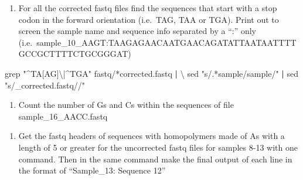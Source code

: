 \documentclass[
  letterpaper,
  DIV=11,
  numbers=noendperiod]{scrreprt}
\newenvironment{Shaded}{\begin{snugshade}}{\end{snugshade}}
\newcommand{\AttributeTok}[1]{\textcolor[rgb]{0.40,0.45,0.13}{#1}}
\newcommand{\DataTypeTok}[1]{\textcolor[rgb]{0.68,0.00,0.00}{#1}}
\newcommand{\FunctionTok}[1]{\textcolor[rgb]{0.28,0.35,0.67}{#1}}
\newcommand{\KeywordTok}[1]{\textcolor[rgb]{0.00,0.23,0.31}{\textbf{#1}}}
\newcommand{\NormalTok}[1]{\textcolor[rgb]{0.00,0.23,0.31}{#1}}
\newcommand{\PreprocessorTok}[1]{\textcolor[rgb]{0.68,0.00,0.00}{#1}}
\newcommand{\StringTok}[1]{\textcolor[rgb]{0.13,0.47,0.30}{#1}}
\providecommand{\tightlist}{%
  \setlength{\itemsep}{0pt}\setlength{\parskip}{0pt}}
\begin{document}
\begin{enumerate}
\def\labelenumi{\arabic{enumi}.}
\setcounter{enumi}{7}
\tightlist
\item
  For all the corrected fastq files find the sequences that start with a
  stop codon in the forward orientation (i.e.~TAG, TAA or TGA). Print
  out to screen the sample name and sequence info separated by a ``:''
  only
  (i.e.~sample\_10\_AAGT:TAAGAGAACAATGAACAGATATTAATAATTTTGCCGCTTTTCTGCGGGAT)
\end{enumerate}

\begin{Shaded}
\begin{Highlighting}[]
\FunctionTok{grep} \StringTok{"\^{}TA[AG]\textbackslash{}|\^{}TGA"}\NormalTok{ fastq/}\PreprocessorTok{*}\NormalTok{corrected.fastq }\KeywordTok{|} \DataTypeTok{\textbackslash{}}
\FunctionTok{sed} \StringTok{"s/.*sample/sample/"} \KeywordTok{|} \FunctionTok{sed} \StringTok{"s/\_corrected.fastq//"}
\end{Highlighting}
\end{Shaded}

\begin{enumerate}
\def\labelenumi{\arabic{enumi}.}
\setcounter{enumi}{8}
\tightlist
\item
  Count the number of Gs and Cs within the sequences of file
  sample\_16\_AACC.fastq
\end{enumerate}

\begin{Shaded}
\end{Shaded}

\begin{enumerate}
\def\labelenumi{\arabic{enumi}.}
\setcounter{enumi}{9}
\tightlist
\item
  Get the fastq headers of sequences with homopolymers made of As with a
  length of 5 or greater for the uncorrected fastq files for samples
  8-13 with one command. Then in the same command make the final output
  of each line in the format of ``Sample\_13: Sequence 12''
\end{enumerate}
\end{document}
